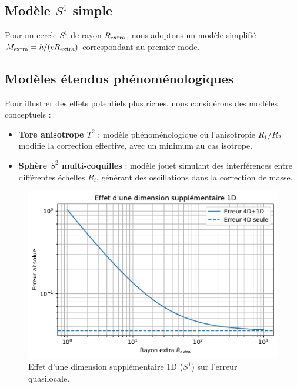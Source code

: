 \documentclass[11pt]{article}
\begin{document}
\subsection{Mod\`ele $S^1$ simple}
Pour un cercle $S^1$ de rayon $R_{\rm extra}$, nous adoptons un mod\`ele simplifi\'e $M_{\rm extra}=\hbar/(c R_{\rm extra})$ correspondant au premier mode.

\subsection{Mod\`eles \'etendus ph\'enom\'enologiques}
Pour illustrer des effets potentiels plus riches, nous consid\'erons des mod\`eles conceptuels : 
\begin{itemize}
\item \textbf{Tore anisotrope $T^2$} : mod\`ele ph\'enom\'enologique o\`u l'anisotropie $R_1/R_2$ modifie la correction effective, avec un minimum au cas isotrope.
\item \textbf{Sph\`ere $S^2$ multi-coquilles} : mod\`ele jouet simulant des interf\'erences entre diff\'erentes \'echelles $R_i$, g\'en\'erant des oscillations dans la correction de masse.
\end{itemize}

\begin{figure}[!htb]
\centering
\includegraphics[width=.75\linewidth]{fig_extra_dimension_effect_improved.pdf}
\caption{Effet d'une dimension suppl\'ementaire 1D (\(S^1\)) sur l'erreur quasilocale.}
\end{figure}
\end{document}
